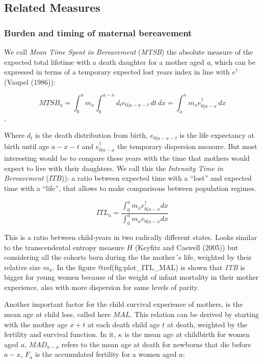 \documentclass[
]{article}
\begin{document}
\hypertarget{related-measures}{%
\subsection{Related Measures}\label{related-measures}}

\hypertarget{burden-and-timing-of-maternal-bereavement}{%
\subsubsection{Burden and timing of maternal
bereavement}\label{burden-and-timing-of-maternal-bereavement}}

We call \emph{Mean Time Spent in Bereavement} (\emph{MTSB}) the absolute
measure of the expected total lifetime with a death daughter for a
mother aged \emph{a}, which can be expressed in terms of a temporary
expected lost years index in line with \(e^\dagger\) (Vaupel (1986)):

\[MTSB_a = \int_0^a{m_x\int_0^{a-x}{d_t e_{0|a-x-t}\, dt}\,dx} = \int_\alpha^a{m_x e_{0|a-x}^\dagger \,dx}\].

Where \(d_t\) is the death distribution from birth, \(e_{0|a-x-t}\) is
the life expectancy at birth until age \(a-x-t\) and
\(e_{0|a-x}^\dagger\) the temporary dispersion measure. But most
interesting would be to compare these years with the time that mothers
would expect to live with their daughters. We call this the
\emph{Intensity Time in Bereavement} (\(ITB\))): a ratio between
expected time with a ``lost'' and expected time with a ``life'', that
allows to make comparisons between population regimes.

\[ITL_a = \frac{\int_0^a{m_x e_{0|{a-x}}^\dagger dx}}{\int_0^a{m_x e_{0|a-x} dx}}\]

This is a ratio between child-years in two radically different states.
Looks similar to the transcendental entropy measure \(H\) (Keyfitz and
Caswell (2005)) but considering all the cohorts born during the the
mother´s life, weighted by their relative size \(m_x\). In the figure
@ref(fig:plot\_ITL\_MAL) is shown that \emph{ITB} is bigger for young
women because of the weight of infant mortality in their mother
experience, also with more dispersion for same levels of parity.

Another important factor for the child survival experience of mothers,
is the mean age at child loss, called here \(MAL\). This relation can be
derived by starting with the mother age \(x+t\) at each death child age
\(t\) at death, weighted by the fertility and survival function. In it,
\(\kappa\) is the mean age at childbirth for women aged \(a\),
\(MAD_{a-x}\) refers to the mean age at death for newborns that die
before \(a-x\), \(F_a\) is the accumulated fertility for a women aged
\(a\):
\end{document}
